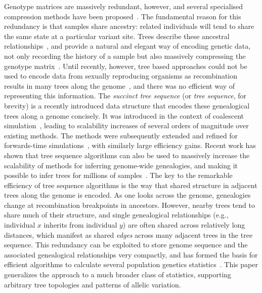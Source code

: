 \documentclass{article}
\begin{document}
Genotype matrices are massively redundant, however, and several specialised
compression methods
have been proposed~\citep{durbin2014efficient,layer2016efficient,danek2018gtc,lin2019sparse}.
The fundamental reason for this redundancy is that samples share ancestry:
related individuals will tend to share the same state at a particular variant site.
Trees describe these ancestral
relationships~\citep{felsenstein2004inferring,semple2003phylogenetics},
and provide a natural and elegant way of encoding genetic data,
not only recording the history of a sample but also massively compressing
the genotype matrix~\citep{ane2005missing}. Until recently, however,
tree based approaches could not be used to encode data from sexually
reproducing organisms as recombination results in many trees along the
genome~\citep{griffiths1991two,griffiths1996ancestral,rasmussen2014genome},
and there was no efficient way of representing this information.
The \emph{succinct tree sequence} (or \emph{tree sequence}, for brevity)
is a recently introduced data structure that
encodes these genealogical trees along a genome concisely.
It was introduced in the context of coalescent
simulation~\citep{kelleher2016efficient}, leading to scalability increases of
several orders of magnitude over existing methods. The methods were subsequently extended
and refined for forwards-time
simulations~\citep{kelleher2018efficient,haller2018tree}, with similarly large efficiency gains.
Recent work has shown that tree sequence algorithms can
also be used to massively increase the scalability of methods for inferring
genome-wide genealogies, and making it possible to infer trees for millions of
samples~\citep{kelleher2019inferring}.
The key to the remarkable efficiency of tree sequence
algorithms is the way that shared structure in adjacent trees along the genome is encoded.
As one looks across the genome, genealogies change at recombination breakpoints in ancestors.
However, nearby trees tend to share much of their structure,
and single genealogical relationships (e.g., individual $x$ inherits from individual $y$)
are often shared across relatively long distances,
which manifest as shared \emph{edges} across many adjacent trees in the tree sequence.
This redundancy can be exploited to store genome sequence and the
associated genealogical relationships very compactly, and has formed the basis for
efficient algorithms to calculate several population genetics
statistics~\citep{kelleher2016efficient}.
This paper generalizes the approach to a much broader class of statistics,
supporting arbitrary tree topologies and patterns of allelic variation.
\end{document}
